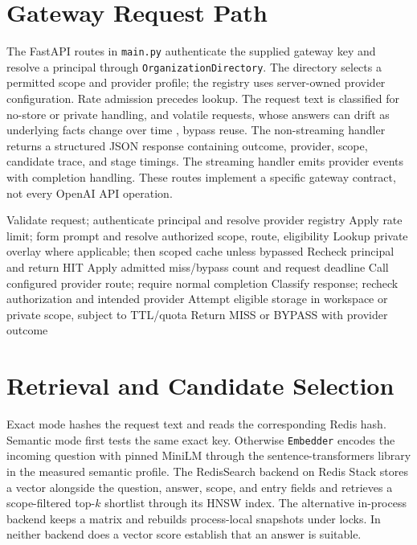 \section{Gateway Request Path}
The FastAPI routes \cite{fastapi} in \texttt{main.py} authenticate the supplied gateway key and resolve a principal through \texttt{OrganizationDirectory}. The directory selects a permitted scope and provider profile; the registry uses server-owned provider configuration. Rate admission precedes lookup. The request text is classified for no-store or private handling, and volatile requests, whose answers can drift as underlying facts change over time \cite{gama2014survey}, bypass reuse. The non-streaming handler returns a structured JSON response containing outcome, provider, scope, candidate trace, and stage timings. The streaming handler emits provider events with completion handling. These routes implement a specific gateway contract, not every OpenAI API operation.

\begin{algorithm}[htbp]
\caption{Implemented request decision at the fixed checkpoint}\label{alg:gateway}
\begin{algorithmic}[1]
\State Validate request; authenticate principal and resolve provider registry
\State Apply rate limit; form prompt and resolve authorized scope, route, eligibility
\State Lookup private overlay where applicable; then scoped cache unless bypassed
  \State Recheck principal and return HIT
\EndIf
\State Apply admitted miss/bypass count and request deadline
\State Call configured provider route; require normal completion
\State Classify response; recheck authorization and intended provider
\State Attempt eligible storage in workspace or private scope, subject to TTL/quota
\State Return MISS or BYPASS with provider outcome
\end{algorithmic}
\end{algorithm}

\section{Retrieval and Candidate Selection}
Exact mode hashes the request text and reads the corresponding Redis hash. Semantic mode first tests the same exact key. Otherwise \texttt{Embedder} encodes the incoming question with pinned MiniLM through the sentence-transformers library \cite{sentencetransformers} in the measured semantic profile. The RedisSearch backend on Redis Stack \cite{redis_stack} stores a vector alongside the question, answer, scope, and entry fields and retrieves a scope-filtered top-$k$ shortlist through its HNSW index. The alternative in-process backend keeps a matrix and rebuilds process-local snapshots under locks. In neither backend does a vector score establish that an answer is suitable.

